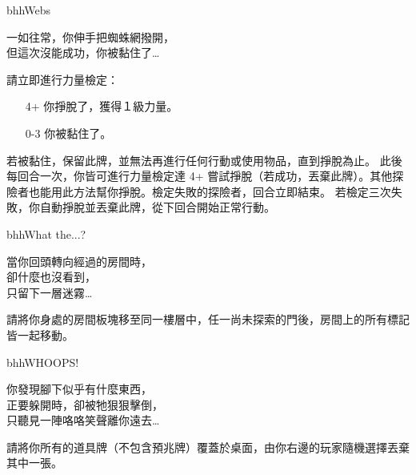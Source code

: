 \linebreak[0]%
\begin{EventCard}{bhh}{Webs}
  \begin{CardStory}
    一如往常，你伸手把蜘蛛網撥開，\\
    但這次沒能成功，你被黏住了…
  \end{CardStory}
  請立即進行力量檢定：
  \begin{itemize}
    \item[4+] 你掙脫了，獲得１級力量。
    \item[0-3] 你被黏住了。
  \end{itemize}
  若被黏住，保留此牌，並無法再進行任何行動或使用物品，直到掙脫為止。\smallbreak
  此後每回合一次，你皆可進行力量檢定達 4+ 嘗試掙脫（若成功，丟棄此牌）。其他探險者也能用此方法幫你掙脫。檢定失敗的探險者，回合立即結束。\smallbreak
  若檢定三次失敗，你自動掙脫並丟棄此牌，從下回合開始正常行動。\smallbreak
\end{EventCard}%
\linebreak[0]%
\begin{EventCard}{bhh}{What the...?}
  \begin{CardStory}
    當你回頭轉向經過的房間時，\\
    卻什麼也沒看到，\\
    只留下一層迷霧…
  \end{CardStory}
 請將你身處的房間板塊移至同一樓層中，任一尚未探索的門後，房間上的所有標記皆一起移動。\smallbreak
\end{EventCard}%
\linebreak[0]%
\begin{EventCard}{bhh}{WHOOPS!}
  \begin{CardStory}
    你發現腳下似乎有什麼東西，\\
    正要躲開時，卻被牠狠狠擊倒，\\
    只聽見一陣咯咯笑聲離你遠去…
  \end{CardStory}
 請將你所有的道具牌（不包含預兆牌）覆蓋於桌面，由你右邊的玩家隨機選擇丟棄其中一張。\smallbreak
\end{EventCard}%
\linebreak[0]%
